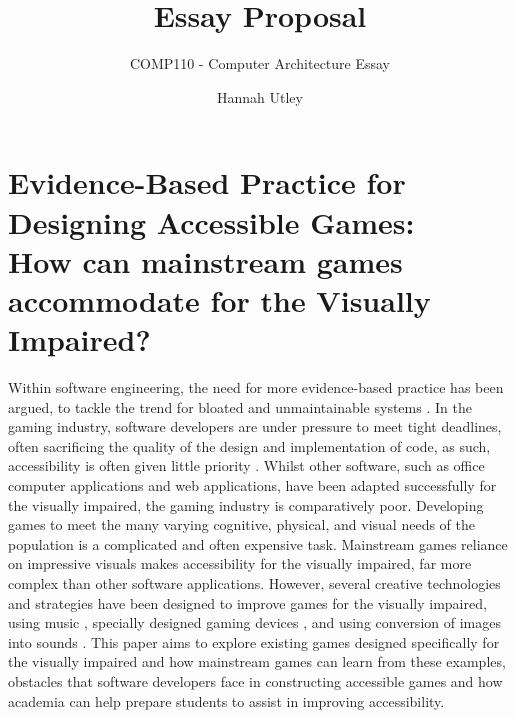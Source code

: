 \documentclass{scrartcl}
\title{Essay Proposal}
\subtitle{COMP110 - Computer Architecture Essay}
\author{Hannah Utley}
\begin{document}
\maketitle

\section*{Evidence-Based Practice for Designing Accessible Games:\\
 How can mainstream games accommodate for the Visually Impaired?}

Within software engineering, the need for more evidence-based practice has been argued, to tackle the trend for bloated and unmaintainable systems \cite{softwaredevelopers}. In the gaming industry, software developers are under pressure to meet tight deadlines, often sacrificing the quality of the design and implementation of code, as such, accessibility is often given little priority \cite{D.McPheron}. Whilst other software, such as office computer applications and web applications, have been adapted successfully for the visually impaired, the gaming industry is comparatively poor.  Developing games to meet the many varying cognitive, physical, and visual needs of the population is a complicated and often expensive task. Mainstream games reliance on impressive visuals makes accessibility for the visually impaired, far more complex than other software applications. However, several creative technologies and strategies have been designed to improve games for the visually impaired, using music \cite{Lotto}, specially designed gaming devices \cite{Ohtsuka}, and using conversion of images into sounds \cite{Marshall}. This paper aims to explore existing games designed specifically for the visually impaired and how mainstream games can learn from these examples, obstacles that software developers face in constructing accessible games and how academia can help prepare students to assist in improving accessibility.
\end{document}
